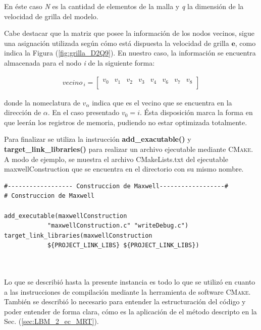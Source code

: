 En éste caso \textit{N} es la cantidad de elementos de la malla y \textit{q} la dimensión de la velocidad de grilla del modelo.

Cabe destacar que la matriz que posee la información de los nodos vecinos, sigue una asignación utilizada según cómo está dispuesta la velocidad de grilla $\mathbf{e}$, como indica la Figura (\ref{fig:grilla_D2Q9}). En nuestro caso, la información se encuentra almacenada para el nodo \textit{i} de la siguiente forma:

\begin{align*}
	vecino_{\>i} =
	\begin{bmatrix}
	v_0 & v_1 & v_2 & v_3 & v_4 & v_6 & v_7 & v_8 \\
	\end{bmatrix}
\end{align*}

donde la nomeclatura de $v_\alpha$ indica que es el vecino que se encuentra en la dirección de $\alpha$. En el caso presentado $v_0 = i$. Ésta disposición marca la forma en que leerán los registros de memoria, pudiendo no estar optimizada totalmente.

Para finalizar se utiliza la instrucción \textbf{add\_exacutable()} y \textbf{target\_link\_libraries()} para realizar un archivo ejecutable mediante \textsc{CMake}. A modo de ejemplo, se muestra el archivo CMakeLists.txt del ejecutable maxwellConstruction que se encuentra en el directorio con su mismo nombre.

{\footnotesize
	\begin{frame}{}
		\begin{lstlisting}[frame=single]
#------------------ Construccion de Maxwell------------------#
# Construccion de Maxwell

add_executable(maxwellConstruction 
			"maxwellConstruction.c" "writeDebug.c")
target_link_libraries(maxwellConstruction 
			${PROJECT_LINK_LIBS} ${PROJECT_LINK_LIBS})

		
		\end{lstlisting}
		
	\end{frame}
}


Lo que se describió hasta la presente instancia es todo lo que se utilizó en cuanto a las instrucciones de compilación mediante la herramienta de software \textsc{CMake}. También se describió lo necesario para entender la estructuración del código y poder entender de forma clara, cómo es la aplicación de el método descripto en la Sec. (\ref{sec:LBM_2_ec_MRT}).

